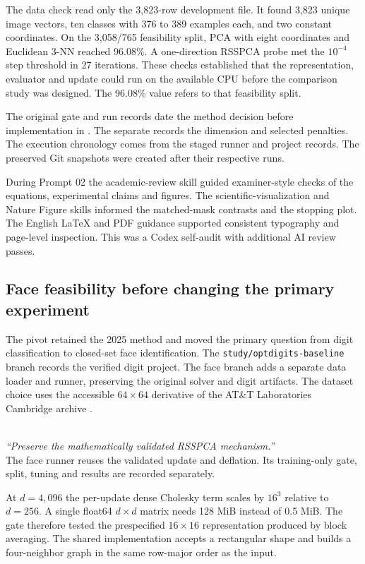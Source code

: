 \documentclass[11pt,a4paper]{article}
\newcommand{\sourcequote}[3]{%
  \par\noindent{\small\texttt{#1}}\\
  \noindent\textit{\textquotedblleft#2\textquotedblright}\\
  \noindent #3\par}
\begin{document}
The data check read only the 3,823-row development file. It found 3,823 unique image vectors, ten classes with 376 to 389 examples each, and two constant coordinates. On the 3,058/765 feasibility split, PCA with eight coordinates and Euclidean 3-NN reached 96.08\%. A one-direction RSSPCA probe met the $10^{-4}$ step threshold in 27 iterations. These checks established that the representation, evaluator and update could run on the available CPU before the comparison study was designed. The 96.08\% value refers to that feasibility split.

The original gate and run records date the method decision before implementation in . The separate  records the dimension and selected penalties. The execution chronology comes from the staged runner and project records. The preserved Git snapshots were created after their respective runs.

During Prompt 02 the academic-review skill guided examiner-style checks of the equations, experimental claims and figures. The scientific-visualization and Nature Figure skills informed the matched-mask contrasts and the stopping plot. The English LaTeX and PDF guidance supported consistent typography and page-level inspection. This was a Codex self-audit with additional AI review passes.

\clearpage
\subsection{Face feasibility before changing the primary experiment}

The pivot retained the 2025 method and moved the primary question from digit classification to closed-set face identification. The \texttt{study/optdigits-baseline} branch records the verified digit project. The face branch adds a separate data loader and runner, preserving the original solver and digit artifacts. The dataset choice uses the accessible $64\times64$ derivative of the AT\&T Laboratories Cambridge archive \citep{attcam,sklearnfaces}.

\sourcequote{01B\_FACE\_PRIMARY\_MIGRATION.md}{Preserve the mathematically validated RSSPCA mechanism.}
{The face runner reuses the validated update and deflation. Its training-only gate, split, tuning and results are recorded separately.}

At $d=4{,}096$ the per-update dense Cholesky term scales by $16^3$ relative to $d=256$. A single float64 $d\times d$ matrix needs 128 MiB instead of 0.5 MiB. The gate therefore tested the prespecified $16\times16$ representation produced by block averaging. The shared implementation accepts a rectangular shape and builds a four-neighbor graph in the same row-major order as the input.
\end{document}
